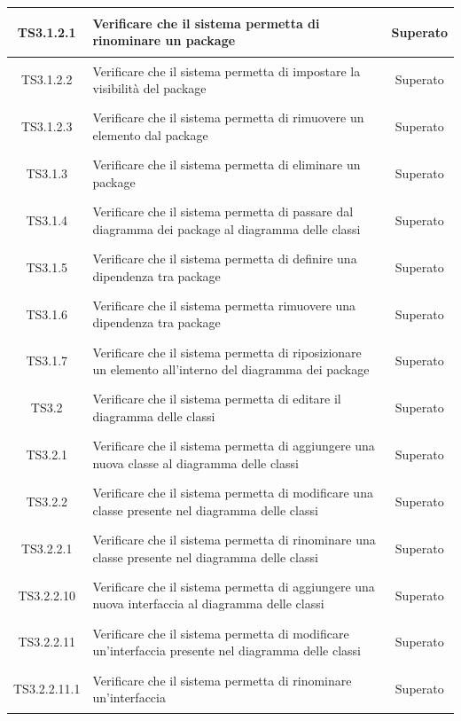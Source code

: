 \documentclass[../PianoDiQualifica.tex]{subfiles}
\begin{document}
\begin{longtable}{|c|>{\centering}p{10cm}|c|}
	\hline
	\hypertarget{TS3.1.2.1}{TS3.1.2.1} & Verificare che il sistema permetta di rinominare un package & Superato \\
	\hline
	\hypertarget{TS3.1.2.2}{TS3.1.2.2} & Verificare che il sistema permetta di impostare la visibilità del package & Superato \\
	\hline
	\hypertarget{TS3.1.2.3}{TS3.1.2.3} & Verificare che il sistema permetta di rimuovere un elemento dal package & Superato \\
	\hline
	\hypertarget{TS3.1.3}{TS3.1.3} & Verificare che il sistema permetta di eliminare un package & Superato \\
	\hline
	\hypertarget{TS3.1.4}{TS3.1.4} & Verificare che il sistema permetta di passare dal diagramma dei package al diagramma delle classi & Superato \\
	\hline
	\hypertarget{TS3.1.5}{TS3.1.5} & Verificare che il sistema permetta di definire una dipendenza tra package & Superato \\
	\hline
	\hypertarget{TS3.1.6}{TS3.1.6} & Verificare che il sistema permetta rimuovere una dipendenza tra package & Superato \\
	\hline
	\hypertarget{TS3.1.7}{TS3.1.7} & Verificare che il sistema permetta di riposizionare un elemento all'interno del diagramma dei package & Superato \\
	\hline
	\hypertarget{TS3.2}{TS3.2} & Verificare che il sistema permetta di editare il diagramma delle classi & Superato \\
	\hline
	\hypertarget{TS3.2.1}{TS3.2.1} & Verificare che il sistema permetta di aggiungere una nuova classe al diagramma delle classi & Superato \\
	\hline
	\hypertarget{TS3.2.2}{TS3.2.2} & Verificare che il sistema permetta di modificare una classe presente nel diagramma delle classi & Superato \\
	\hline
	\hypertarget{TS3.2.2.1}{TS3.2.2.1} & Verificare che il sistema permetta di rinominare una classe presente nel diagramma delle classi & Superato \\
	\hline
	\hypertarget{TS3.2.2.10}{TS3.2.2.10} & Verificare che il sistema permetta di aggiungere una nuova interfaccia al diagramma delle classi & Superato \\
	\hline
	\hypertarget{TS3.2.2.11}{TS3.2.2.11} & Verificare che il sistema permetta di modificare un'interfaccia presente nel diagramma delle classi & Superato \\
	\hline
	\hypertarget{TS3.2.2.11.1}{TS3.2.2.11.1} & Verificare che il sistema permetta di rinominare un'interfaccia & Superato\\

\end{longtable}
\end{document}
